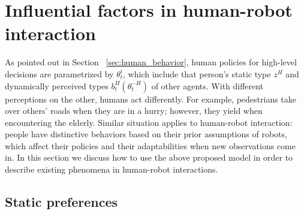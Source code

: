 \documentclass[letterpaper, 10 pt, conference]{ieeeconf}  %
\begin{document}
\color{black}\section{Influential factors in human-robot interaction}
As pointed out in Section ~\ref{sec:human_behavior}, human policies for high-level decisions are parametrized by $\theta^i_t$, which include that person's static type $z^H$ and dynamically perceived types $b^H_t(\theta^{-H}_t)$ of other agents. With different perceptions on the other, humans act differently. For example, pedestrians take over others' roads when they are in a hurry; however, they yield when encountering the elderly. Similar situation 
applies to human-robot interaction: people have distinctive behaviors based on their prior assumptions of robots, which affect their policies and their adaptabilities when new observations come in. In this section we discuss how to use the above proposed model in order to describe	 existing phenomena in human-robot interactions. 

\subsection{Static preferences}
\end{document}
